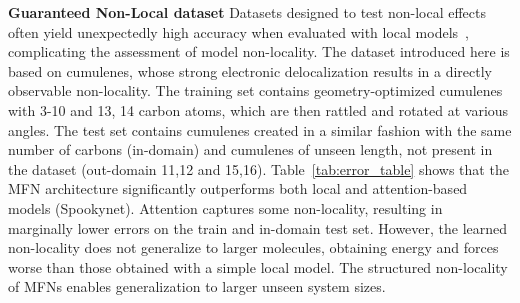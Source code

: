 \documentclass{article} \usepackage{iclr2024_conference,times}
\begin{document}
\textbf{Guaranteed Non-Local dataset}
Datasets designed to test non-local effects often yield unexpectedly high accuracy when evaluated with local models~\citep{kovacsEvaluationMACEForce2023}, complicating the assessment of model non-locality. The dataset introduced here is based on cumulenes, whose strong electronic delocalization results in a directly observable non-locality. The training set contains geometry-optimized cumulenes with 3-10 and 13, 14 carbon atoms, which are then rattled and rotated at various angles. The test set contains cumulenes created in a similar fashion with the same number of carbons (in-domain) and cumulenes of unseen length, not present in the dataset (out-domain 11,12 and 15,16).  Table~\ref{tab:error_table} shows that the MFN architecture significantly outperforms both local and attention-based models (Spookynet). Attention captures some non-locality, resulting in marginally lower errors on the train and in-domain test set. However, the learned non-locality does not generalize to larger molecules, obtaining energy and forces worse than those obtained with a simple local model. The structured non-locality of MFNs enables generalization to larger unseen system sizes.
\begin{table}[htp]
    \centering
    \caption{\textbf{Guaranteed non-local cumulene dataset} containing rattled cumulene chains, with various chain lengths ($n_C$) and hydrogen dihedral angles ($\phi$). The table compares energy (E) and forces (F) RMSEs between local two-layer MPNNs (MACE), global attention MPNNs (SpookyNet), and equivariant MFNs. Train and in-domain test sets contain cumulenes of lengths 3-10 and 13,14. Two out-domain test sets compare different levels of extrapolation to unseen cumulene lengths, containing cumulenes with 11, 12 and 15, 16 carbon atoms, respectively. Bold is best and underline second best.}
    \vspace{-14pt}
    \label{tab:error_table}
\end{table}
\end{document}
